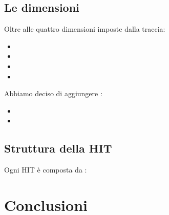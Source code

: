 \documentclass[a4paper,11pt]{report}
\begin{document}
\subsection{Le dimensioni}
Oltre alle quattro dimensioni imposte dalla traccia:
\begin{itemize}
	\item 
	\item 
	\item 
	\item 
\end{itemize}
Abbiamo deciso di aggiungere :
\begin{itemize}
	\item 
	\item 
\end{itemize}


\subsection{Struttura della HIT}
Ogni HIT è composta da : \\



\section{Conclusioni}
\end{document}
